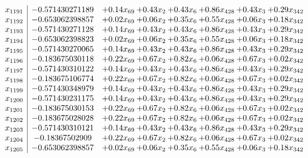 \documentclass[8pt]{article}
\begin{document}
\[\begin{array}{c| c c@{\hskip 2pt} c@{\hskip 2pt} c@{\hskip 2pt} c@{\hskip 2pt} c@{\hskip 2pt} c@{\hskip 2pt} }
 x_{1191}   &  -0.571430271189 & +  0.14 x_{69} & +  0.43 x_{2} & +  0.43 x_{6} & +  0.86 x_{428} & +  0.43 x_{3} & +  0.29 x_{342}\\
 x_{1192}   &  -0.653062398857 & +  0.02 x_{69} & +  0.06 x_{2} & +  0.35 x_{6} & +  0.55 x_{428} & +  0.06 x_{3} & +  0.18 x_{342}\\
 x_{1193}   &  -0.571430271128 & +  0.14 x_{69} & +  0.43 x_{2} & +  0.43 x_{6} & +  0.86 x_{428} & +  0.43 x_{3} & +  0.29 x_{342}\\
 x_{1194}   &  -0.653062398823 & +  0.02 x_{69} & +  0.06 x_{2} & +  0.35 x_{6} & +  0.55 x_{428} & +  0.06 x_{3} & +  0.18 x_{342}\\
 x_{1195}   &  -0.571430270065 & +  0.14 x_{69} & +  0.43 x_{2} & +  0.43 x_{6} & +  0.86 x_{428} & +  0.43 x_{3} & +  0.29 x_{342}\\
 x_{1196}   &  -0.183675030118 & +  0.22 x_{69} & +  0.67 x_{2} & +  0.82 x_{6} & +  0.06 x_{428} & +  0.67 x_{3} & +  0.02 x_{342}\\
 x_{1197}   &  -0.571430310122 & +  0.14 x_{69} & +  0.43 x_{2} & +  0.43 x_{6} & +  0.86 x_{428} & +  0.43 x_{3} & +  0.29 x_{342}\\
 x_{1198}   &  -0.183675106774 & +  0.22 x_{69} & +  0.67 x_{2} & +  0.82 x_{6} & +  0.06 x_{428} & +  0.67 x_{3} & +  0.02 x_{342}\\
 x_{1199}   &  -0.571430348979 & +  0.14 x_{69} & +  0.43 x_{2} & +  0.43 x_{6} & +  0.86 x_{428} & +  0.43 x_{3} & +  0.29 x_{342}\\
 x_{1200}   &  -0.571430231175 & +  0.14 x_{69} & +  0.43 x_{2} & +  0.43 x_{6} & +  0.86 x_{428} & +  0.43 x_{3} & +  0.29 x_{342}\\
 x_{1201}   &  -0.183675030153 & +  0.22 x_{69} & +  0.67 x_{2} & +  0.82 x_{6} & +  0.06 x_{428} & +  0.67 x_{3} & +  0.02 x_{342}\\
 x_{1202}   &  -0.183675028028 & +  0.22 x_{69} & +  0.67 x_{2} & +  0.82 x_{6} & +  0.06 x_{428} & +  0.67 x_{3} & +  0.02 x_{342}\\
 x_{1203}   &  -0.571430310121 & +  0.14 x_{69} & +  0.43 x_{2} & +  0.43 x_{6} & +  0.86 x_{428} & +  0.43 x_{3} & +  0.29 x_{342}\\
 x_{1204}   &  -0.18367502909 & +  0.22 x_{69} & +  0.67 x_{2} & +  0.82 x_{6} & +  0.06 x_{428} & +  0.67 x_{3} & +  0.02 x_{342}\\
 x_{1205}   &  -0.653062398857 & +  0.02 x_{69} & +  0.06 x_{2} & +  0.35 x_{6} & +  0.55 x_{428} & +  0.06 x_{3} & +  0.18 x_{342}\\

\end{array}\]
\end{document}
